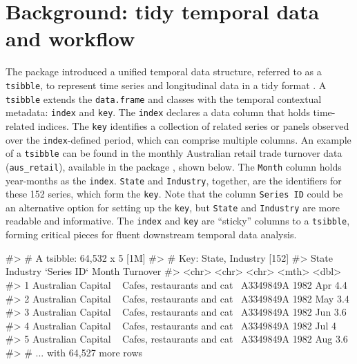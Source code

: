 \hypertarget{background-tidy-temporal-data-and-workflow}{%
\section{Background: tidy temporal data and
workflow}\label{background-tidy-temporal-data-and-workflow}}

The  package \citep{wang2020tsibble} introduced a
unified temporal data structure, referred to as a \texttt{tsibble}, to
represent time series and longitudinal data in a tidy format
\citep{wickham2014tidy}. A \texttt{tsibble} extends the
\texttt{data.frame} and  classes with the temporal
contextual metadata: \texttt{index} and \texttt{key}. The \texttt{index}
declares a data column that holds time-related indices. The \texttt{key}
identifies a collection of related series or panels observed over the
\texttt{index}-defined period, which can comprise multiple columns. An
example of a \texttt{tsibble} can be found in the monthly Australian
retail trade turnover data (\texttt{aus\_retail}), available in the
 package \citep{R-tsibbledata}, shown below. The
\texttt{Month} column holds year-months as the \texttt{index}.
\texttt{State} and \texttt{Industry}, together, are the identifiers for
these 152 series, which form the \texttt{key}. Note that the column
\texttt{Series\ ID} could be an alternative option for setting up the
\texttt{key}, but \texttt{State} and \texttt{Industry} are more readable
and informative. The \texttt{index} and \texttt{key} are ``sticky''
columns to a \texttt{tsibble}, forming critical pieces for fluent
downstream temporal data analysis.

\begin{Schunk}
\begin{Soutput}
#> # A tsibble: 64,532 x 5 [1M]
#> # Key:       State, Industry [152]
#>   State                Industry                    `Series ID`    Month Turnover
#>   <chr>                <chr>                       <chr>          <mth>    <dbl>
#> 1 Australian Capital ~ Cafes, restaurants and cat~ A3349849A   1982 Apr      4.4
#> 2 Australian Capital ~ Cafes, restaurants and cat~ A3349849A   1982 May      3.4
#> 3 Australian Capital ~ Cafes, restaurants and cat~ A3349849A   1982 Jun      3.6
#> 4 Australian Capital ~ Cafes, restaurants and cat~ A3349849A   1982 Jul      4  
#> 5 Australian Capital ~ Cafes, restaurants and cat~ A3349849A   1982 Aug      3.6
#> # ... with 64,527 more rows
\end{Soutput}
\end{Schunk}

